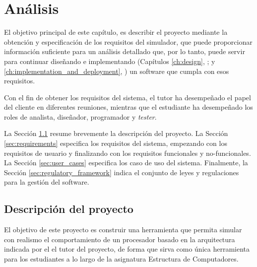 \chead[]{}
\renewcommand{\headrulewidth}{0.5pt}

\lfoot[]{}
\cfoot[]{}
\rfoot[]{}
\renewcommand{\footrulewidth}{0pt}

\chapter{Análisis}
\label{ch:analysis}

El objetivo principal de este capítulo, es describir el proyecto mediante la obtención y especificación de los requisitos del simulador, que puede proporcionar información suficiente para un análisis detallado que, por lo tanto, puede servir para continuar diseñando e implementando (Capítulos \ref{ch:design}, \textit{}; y \ref{ch:implementation_and_deployment}, \textit{}) un software que cumpla con esos requisitos. 

Con el fin de obtener los requisitos del sistema, el tutor ha desempeñado el papel del cliente en diferentes reuniones, mientras que el estudiante ha desempeñado los roles de analista, diseñador, programador y \emph{tester}.

La Sección \ref{sec:project_description} resume brevemente la descripción del proyecto. La Sección \ref{sec:requirements} especifica los requisitos del sistema, empezando con los requisitos de usuario y finalizando con los requisitos funcionales y no-funcionales. La Sección \ref{sec:user_cases} especifica los caso de uso del sistema. Finalmente, la Sección \ref{sec:regulatory_framework} indica el conjunto de leyes y regulaciones para la gestión del software.  

\section{Descripción del proyecto}
\label{sec:project_description}

El objetivo de este proyecto es construir una herramienta que permita simular con realismo el comportamiento de un procesador basado en la arquitectura indicada por el el tutor del proyecto, de forma que sirva como única herramienta para los estudiantes a lo largo de la asignatura Estructura de Computadores.

